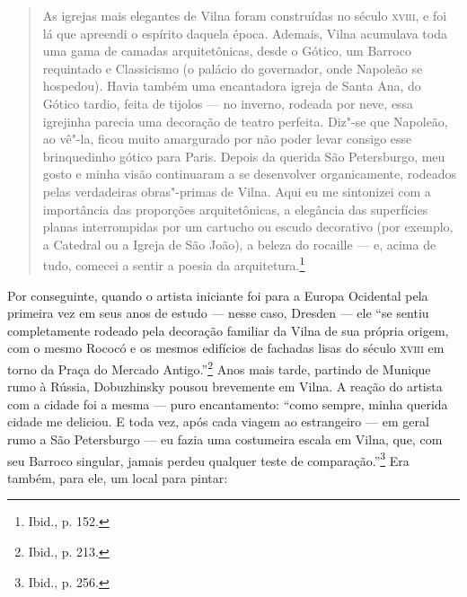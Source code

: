 \begin{quote}
As igrejas mais elegantes de Vilna foram construídas no século \textsc{xviii}, e foi
lá que apreendi o espírito daquela época. Ademais, Vilna acumulava toda
uma gama de camadas arquitetônicas, desde o Gótico, um Barroco
requintado e Classicismo (o palácio do governador, onde Napoleão se
hospedou). Havia também uma encantadora igreja de Santa Ana, do Gótico
tardio, feita de tijolos --- no inverno, rodeada por neve, essa igrejinha
parecia uma decoração de teatro perfeita. Diz"-se que Napoleão, ao vê"-la,
ficou muito amargurado por não poder levar consigo esse brinquedinho
gótico para Paris. Depois da querida São Petersburgo, meu gosto e minha
visão continuaram a se desenvolver organicamente, rodeados pelas
verdadeiras obras"-primas de Vilna. Aqui eu me sintonizei com a
importância das proporções arquitetônicas, a elegância das superfícies
planas interrompidas por um cartucho ou escudo decorativo (por exemplo,
a Catedral ou a Igreja de São João), a beleza do rocaille --- e, acima de
tudo, comecei a sentir a poesia da arquitetura.\footnote{Ibid., p. 152.}
\end{quote}

%

Por conseguinte, quando o artista iniciante foi para a Europa Ocidental
pela primeira vez em seus anos de estudo --- nesse caso, Dresden --- ele
``se sentiu completamente rodeado pela decoração familiar da Vilna de
sua própria origem, com o mesmo Rococó e os mesmos edifícios de fachadas
lisas do século \textsc{xviii} em torno da Praça do Mercado Antigo.''\footnote{Ibid., p. 213.} Anos mais tarde, partindo de Munique rumo à Rússia, Dobuzhinsky pousou brevemente em Vilna. A reação do artista com a cidade
foi a mesma --- puro encantamento: ``como sempre, minha querida cidade me
deliciou. E toda vez, após cada viagem ao estrangeiro --- em geral rumo a
São Petersburgo --- eu fazia uma costumeira escala em Vilna, que, com seu
Barroco singular, jamais perdeu qualquer teste de
comparação.''\footnote{Ibid., p. 256.} Era também, para ele, um local
para pintar:

